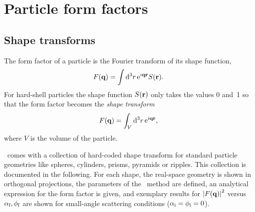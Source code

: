 

\chapter{Particle form factors}  \label{SFF}

\makeatletter
\renewcommand{\@thesubfigure}{\relax}
\makeatother


\section{Shape transforms}

The form factor of a particle is the Fourier transform
of its shape function,
\begin{equation}
  F(\mathbf{q})=\int {\rm d}^3r\, {\rm e}^{i\mathbf{q}\mathbf{r}} S(\mathbf{r}).
\end{equation}
For hard-shell particles the shape function $S(\mathbf{r})$
only takes the values 0 and~1
so that the form factor becomes
the \textit{shape transform}
\begin{equation}\label{eq:FFHard}
  F(\mathbf{q})=\int_V {\rm d}^3r\, {\rm e}^{i\mathbf{q}\mathbf{r}},
\end{equation}
where $V$ is the volume of the particle.
%

\BornAgain\ comes with a collection of hard-coded 
shape transform for standard particle geometries like
spheres, cylinders, prisms, pyramids or ripples.
This collection is documented in the following.
For each shape,
the real-space geometry is shown in orthogonal projections,
the parameters of the \BornAgain\ method are defined,
an analytical expression for the form factor is given,
and exemplary results for $\left|F(\mathbf{q})\right|^2$ versus
$\alpha_{\text{f}},\phi_{\text{f}}$ are shown for small-angle scattering conditions
($\alpha_{\text{i}}=\phi_{\text{i}}=0$).

